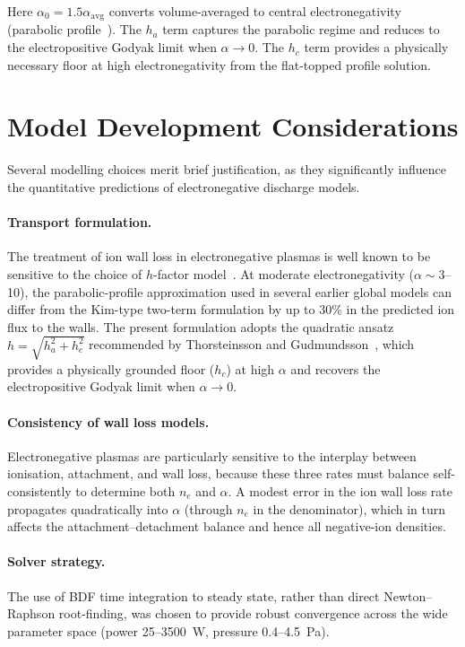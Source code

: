 \documentclass[11pt,a4paper]{report}
\begin{document}
Here $\alpha_0 = 1.5\alpha_\text{avg}$ converts volume-averaged to central electronegativity (parabolic profile~\cite{Lieberman2005}).  The $h_a$ term captures the parabolic regime and reduces to the electropositive Godyak limit when $\alpha \to 0$.  The $h_c$ term provides a physically necessary floor at high electronegativity from the flat-topped profile solution.

\section{Model Development Considerations}
\label{sec:pure_devnotes}

Several modelling choices merit brief justification, as they significantly influence the quantitative predictions of electronegative discharge models.

\paragraph{Transport formulation.}  The treatment of ion wall loss in electronegative plasmas is well known to be sensitive to the choice of $h$-factor model~\cite{Kim2006,Monahan2008}.  At moderate electronegativity ($\alpha \sim 3$--10), the parabolic-profile approximation used in several earlier global models can differ from the Kim-type two-term formulation by up to 30\% in the predicted ion flux to the walls.  The present formulation adopts the quadratic ansatz $h = \sqrt{h_a^2 + h_c^2}$ recommended by Thorsteinsson and Gudmundsson~\cite{Thorsteinsson2010}, which provides a physically grounded floor ($h_c$) at high $\alpha$ and recovers the electropositive Godyak limit when $\alpha \to 0$.

\paragraph{Consistency of wall loss models.}  Electronegative plasmas are particularly sensitive to the interplay between ionisation, attachment, and wall loss, because these three rates must balance self-consistently to determine both $n_e$ and $\alpha$.  A modest error in the ion wall loss rate propagates quadratically into $\alpha$ (through $n_e$ in the denominator), which in turn affects the attachment--detachment balance and hence all negative-ion densities.

\paragraph{Solver strategy.}  The use of BDF time integration to steady state, rather than direct Newton--Raphson root-finding, was chosen to provide robust convergence across the wide parameter space (power 25--\SI{3500}{\watt}, pressure 0.4--\SI{4.5}{\pascal}).
\end{document}
